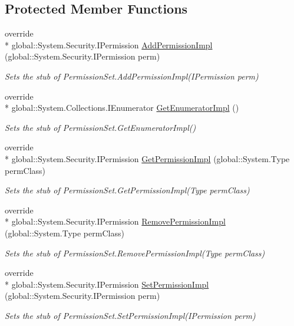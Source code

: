 \subsection*{Protected Member Functions}
\begin{DoxyCompactItemize}
\item 
override \\*
global\-::\-System.\-Security.\-I\-Permission \hyperlink{class_system_1_1_security_1_1_fakes_1_1_stub_permission_set_a817f4ad8d425e769a802f764d5b3c68b}{Add\-Permission\-Impl} (global\-::\-System.\-Security.\-I\-Permission perm)
\begin{DoxyCompactList}\small\item\em Sets the stub of Permission\-Set.\-Add\-Permission\-Impl(\-I\-Permission perm)\end{DoxyCompactList}\item 
override \\*
global\-::\-System.\-Collections.\-I\-Enumerator \hyperlink{class_system_1_1_security_1_1_fakes_1_1_stub_permission_set_a52e350e91e046b8b8689670d28173ae2}{Get\-Enumerator\-Impl} ()
\begin{DoxyCompactList}\small\item\em Sets the stub of Permission\-Set.\-Get\-Enumerator\-Impl()\end{DoxyCompactList}\item 
override \\*
global\-::\-System.\-Security.\-I\-Permission \hyperlink{class_system_1_1_security_1_1_fakes_1_1_stub_permission_set_a13faead8bc325bda56844af27d77768a}{Get\-Permission\-Impl} (global\-::\-System.\-Type perm\-Class)
\begin{DoxyCompactList}\small\item\em Sets the stub of Permission\-Set.\-Get\-Permission\-Impl(\-Type perm\-Class)\end{DoxyCompactList}\item 
override \\*
global\-::\-System.\-Security.\-I\-Permission \hyperlink{class_system_1_1_security_1_1_fakes_1_1_stub_permission_set_adc5610f05c65733dc77168c4be24dae0}{Remove\-Permission\-Impl} (global\-::\-System.\-Type perm\-Class)
\begin{DoxyCompactList}\small\item\em Sets the stub of Permission\-Set.\-Remove\-Permission\-Impl(\-Type perm\-Class)\end{DoxyCompactList}\item 
override \\*
global\-::\-System.\-Security.\-I\-Permission \hyperlink{class_system_1_1_security_1_1_fakes_1_1_stub_permission_set_acfca87329a2a5c300c269214944069b7}{Set\-Permission\-Impl} (global\-::\-System.\-Security.\-I\-Permission perm)
\begin{DoxyCompactList}\small\item\em Sets the stub of Permission\-Set.\-Set\-Permission\-Impl(\-I\-Permission perm)\end{DoxyCompactList}\end{DoxyCompactItemize}
